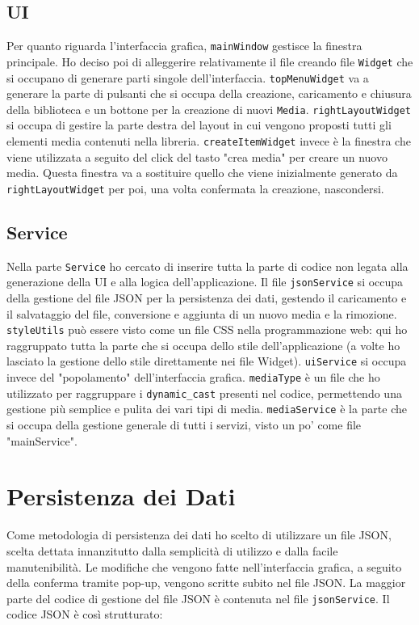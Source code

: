 \documentclass[a4paper,12pt]{article}
\begin{document}
\subsection{UI}
Per quanto riguarda l'interfaccia grafica, \texttt{mainWindow} gestisce la finestra principale. Ho deciso poi di alleggerire relativamente il file creando file \texttt{Widget} che si occupano di generare parti singole dell'interfaccia. \texttt{topMenuWidget} va a generare la parte di pulsanti che si occupa della creazione, caricamento e chiusura della biblioteca e un bottone per la creazione di nuovi \texttt{Media}. \texttt{rightLayoutWidget} si occupa di gestire la parte destra del layout in cui vengono proposti tutti gli elementi media contenuti nella libreria. \texttt{createItemWidget} invece è la finestra che viene utilizzata a seguito del click del tasto "crea media" per creare un nuovo media. Questa finestra va a sostituire quello che viene inizialmente generato da \texttt{rightLayoutWidget} per poi, una volta confermata la creazione, nascondersi.

\subsection{Service}
Nella parte \texttt{Service} ho cercato di inserire tutta la parte di codice non legata alla generazione della UI e alla logica dell'applicazione. Il file \texttt{jsonService} si occupa della gestione del file JSON per la persistenza dei dati, gestendo il caricamento e il salvataggio del file, conversione e aggiunta di un nuovo media e la rimozione. \texttt{styleUtils} può essere visto come un file CSS nella programmazione web: qui ho raggruppato tutta la parte che si occupa dello stile dell'applicazione (a volte ho lasciato la gestione dello stile direttamente nei file Widget). \texttt{uiService} si occupa invece del "popolamento" dell'interfaccia grafica. \texttt{mediaType} è un file che ho utilizzato per raggruppare i \texttt{dynamic\_cast} presenti nel codice, permettendo una gestione più semplice e pulita dei vari tipi di media. \texttt{mediaService} è la parte che si occupa della gestione generale di tutti i servizi, visto un po' come file "mainService".

\section{Persistenza dei Dati}
Come metodologia di persistenza dei dati ho scelto di utilizzare un file JSON, scelta dettata innanzitutto dalla semplicità di utilizzo e dalla facile manutenibilità. Le modifiche che vengono fatte nell'interfaccia grafica, a seguito della conferma tramite pop-up, vengono scritte subito nel file JSON. La maggior parte del codice di gestione del file JSON è contenuta nel file \texttt{jsonService}.\newline
Il codice JSON è così strutturato:
\end{document}
